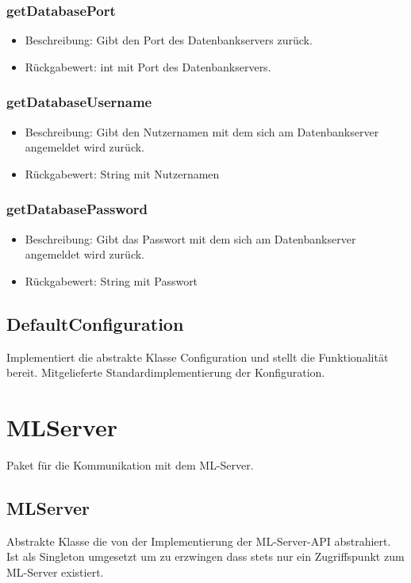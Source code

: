 \documentclass[a4paper]{scrreprt}
\begin{document}
    \subsubsection{getDatabasePort}
    \begin{itemize}
        \item Beschreibung: Gibt den Port des Datenbankservers zurück.
        \item Rückgabewert: int mit Port des Datenbankservers.
    \end{itemize}

    \subsubsection{getDatabaseUsername}
    \begin{itemize}
        \item Beschreibung: Gibt den Nutzernamen mit dem sich am Datenbankserver angemeldet wird zurück.
        \item Rückgabewert: String mit Nutzernamen
    \end{itemize}

    \subsubsection{getDatabasePassword}
    \begin{itemize}
        \item Beschreibung: Gibt das Passwort mit dem sich am Datenbankserver angemeldet wird zurück.
        \item Rückgabewert: String mit Passwort
    \end{itemize}

    \subsection{DefaultConfiguration}
    Implementiert die abstrakte Klasse Configuration und stellt die Funktionalität bereit.
    Mitgelieferte Standardimplementierung der Konfiguration.

    \section{MLServer}
    Paket für die Kommunikation mit dem ML-Server.

    \subsection{MLServer}
    Abstrakte Klasse die von der Implementierung der ML-Server-API abstrahiert.
    Ist als Singleton umgesetzt um zu erzwingen dass stets nur ein Zugriffspunkt zum ML-Server existiert.
\end{document}
